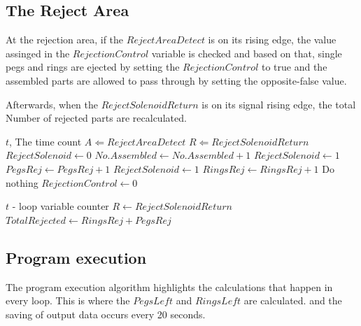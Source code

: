 \documentclass[12pt]{article}
\makeatletter
\newcommand*{\currentname}{\@currentlabelname}
\makeatother
\begin{document}
\subsection{The Reject Area}
  At the rejection area, if the $RejectAreaDetect$ is on its rising edge,
  the value assinged in the $RejectionControl$ variable is checked and based on that,
  single pegs and rings are ejected by setting the $RejectionControl$ to true and the assembled
  parts are allowed to pass through by setting the opposite-false value.

  Afterwards, when the $RejectSolenoidReturn$ is on its signal rising edge, the total Number
  of rejected parts are recalculated.

  \begin{algorithm}[H]
    \caption{\currentname}
    \begin{algorithmic}
      \REQUIRE $t$, The time count
      \STATE $A \Leftarrow RejectAreaDetect$
      \STATE $R \Leftarrow RejectSolenoidReturn$
            \STATE $RejectSolenoid \leftarrow 0$
            \STATE $No.Assembled \leftarrow No.Assembled + 1$
            \STATE $RejectSolenoid \leftarrow 1$
            \STATE $PegsRej \leftarrow PegsRej + 1$
            \STATE $RejectSolenoid \leftarrow 1$
            \STATE $RingsRej \leftarrow RingsRej + 1$
            \STATE Do nothing
          \ENDIF
          \STATE $RejectionControl \leftarrow 0$
        \ENDIF
      \ENDWHILE
    \end{algorithmic}

    \begin{algorithmic}
      \REQUIRE $t$ - loop variable counter
      \STATE $R \leftarrow RejectSolenoidReturn$
        \STATE $TotalRejected \leftarrow RingsRej + PegsRej$
      \ENDIF
    \end{algorithmic}
  \end{algorithm}

\subsection{Program execution}
  The program execution algorithm highlights the calculations that happen in every loop.
  This is where the $PegsLeft$ and $RingsLeft$ are calculated. and the saving of output data
  occurs every 20 seconds.
\end{document}
